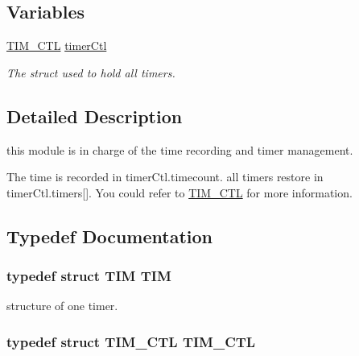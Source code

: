 \subsection*{Variables}
\begin{DoxyCompactItemize}
\item 
\hyperlink{struct_t_i_m___c_t_l}{T\+I\+M\+\_\+\+C\+T\+L} \hyperlink{group__tim_gaafedf127c23194e2418754189b320aa2}{timer\+Ctl}
\begin{DoxyCompactList}\small\item\em The struct used to hold all timers. \end{DoxyCompactList}\end{DoxyCompactItemize}


\subsection{Detailed Description}
this module is in charge of the time recording and timer management. 

The time is recorded in timer\+Ctl.\+timecount. all timers restore in timer\+Ctl.\+timers\mbox{[}\mbox{]}. You could refer to \hyperlink{struct_t_i_m___c_t_l}{T\+I\+M\+\_\+\+C\+T\+L} for more information. 

\subsection{Typedef Documentation}
\hypertarget{group__tim_ga26669a4a8b52c4fd916ee5faf066be19}{}
\subsubsection[{T\+I\+M}]{\setlength{\rightskip}{0pt plus 5cm}typedef struct {\bf T\+I\+M} {\bf T\+I\+M}}\label{group__tim_ga26669a4a8b52c4fd916ee5faf066be19}


structure of one timer. 

\hypertarget{group__tim_ga4091d5ac2e18168e0642a8e7fb363590}{}
\subsubsection[{T\+I\+M\+\_\+\+C\+T\+L}]{\setlength{\rightskip}{0pt plus 5cm}typedef struct {\bf T\+I\+M\+\_\+\+C\+T\+L} {\bf T\+I\+M\+\_\+\+C\+T\+L}}\label{group__tim_ga4091d5ac2e18168e0642a8e7fb363590}


